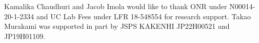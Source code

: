 \documentclass[sigconf]{acmart}
\begin{document}
\begin{acks}
Kamalika Chaudhuri and Jacob Imola would like to thank ONR under N00014-20-1-2334 and UC Lab Fees under LFR 18-548554  for research support.
Takao Murakami was supported in part by JSPS KAKENHI JP22H00521 and JP19H01109.
\end{acks}





\end{document}

